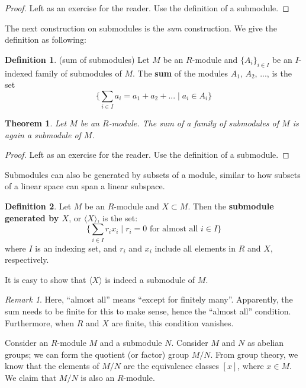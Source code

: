 \documentclass[12pt, a4paper, titlepage]{report}
\theoremstyle{plain} %
\newtheorem{thm}{Theorem}[section]
\theoremstyle{definition}
\newtheorem{defn}{Definition}[section]
\theoremstyle{remark}
\newtheorem*{rem}{Remark}
\newcommand\dangle[1]{\langle {#1} \rangle}
\begin{document}
\begin{proof}
  Left as an exercise for the reader. Use the definition of a submodule.
\end{proof}

The next construction on submodules is the \textit{sum} construction. We give the definition as following:

\begin{defn}(sum of submodules)
  Let $M$ be an $R$-module and $\{A_i\}_{i \in I}$ be an $I$-indexed family of submodules of $M$. The \textbf{sum} of the
  modules $A_1$, $A_2$, ..., is the set
  \[
    \{ \sum_{i \in I} a_i = a_1 + a_2 + ... \mid a_i \in A_i \}
  \]
\end{defn}

\begin{thm}
  Let $M$ be an $R$-module. The sum of a family of submodules of $M$ is again a submodule of $M$.
\end{thm}

\begin{proof}
  Left as an exercise for the reader. Use the definition of a submodule.
\end{proof}

Submodules can also be generated by subsets of a module, similar to how subsets of a linear space can span a linear subspace.

\begin{defn}
  Let $M$ be an $R$-module and $X \subset M$. Then the \textbf{submodule generated by $X$}, or $\dangle{X}$, is the set:
  \[
    \{ \sum_{i \in I} r_ix_i \mid r_i = 0 \text{ for almost all } i \in I \}
  \]
  where $I$ is an indexing set, and $r_i$ and $x_i$ include all elements in $R$ and $X$, respectively.
\end{defn}

It is easy to show that $\dangle{X}$ is indeed a submodule of $M$.

\begin{rem}
  Here, ``almost all'' means ``except for finitely many''. Apparently, the sum needs to be finite for this to make sense, hence
  the ``almost all'' condition. Furthermore, when $R$ and $X$ are finite, this condition vanishes.
\end{rem}

Consider an $R$-module $M$ and a submodule $N$. Consider $M$ and $N$ as abelian groups; we can form the quotient (or factor)
group $M/N$. From group theory, we know that the elements of $M/N$ are the equivalence classes $[x]$, where $x \in M$.
We claim that $M/N$ is also an $R$-module.
\end{document}
